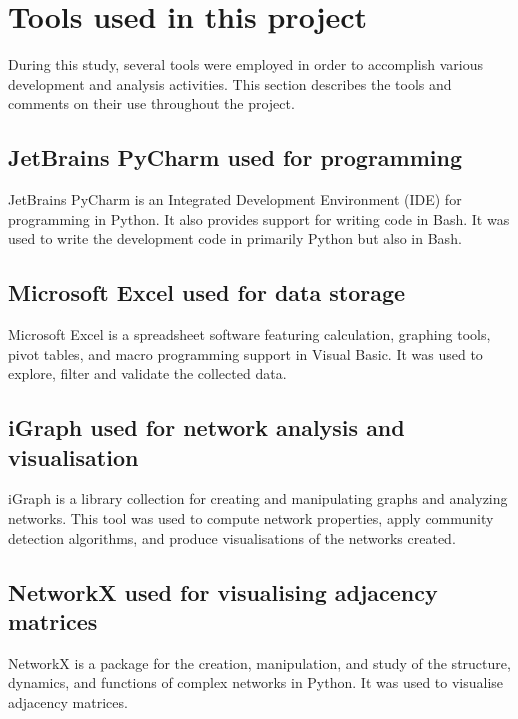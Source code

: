 \section{Tools used in this project}

During this study, several tools were employed in order to accomplish various development and analysis activities. This section describes the tools and comments on their use throughout the project.

\subsection{JetBrains PyCharm used for programming}

JetBrains PyCharm \cite{jetbrains_pycharm} is an Integrated Development Environment (IDE) for programming in Python. It also provides support for writing code in Bash. It was used to write the development code in primarily Python but also in Bash.

\subsection{Microsoft Excel used for data storage}

Microsoft Excel \cite{microsoft_excel} is a spreadsheet software featuring calculation, graphing tools, pivot tables, and macro programming support in Visual Basic. It was used to explore, filter and validate the collected data.

\subsection{iGraph used for network analysis and visualisation}

iGraph \cite{csardi2006igraph} is a library collection for creating and manipulating graphs and analyzing networks. This tool was used to compute network properties, apply community detection algorithms, and produce visualisations of the networks created.

\subsection{NetworkX used for visualising adjacency matrices}

NetworkX \cite{networkx} is a package for the creation, manipulation, and study of the structure, dynamics, and functions of complex networks in Python. It was used to visualise adjacency matrices.


